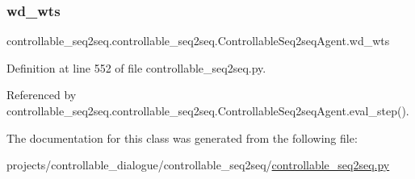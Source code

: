 \subsubsection{\texorpdfstring{wd\+\_\+wts}{wd\_wts}}
{\footnotesize\ttfamily controllable\+\_\+seq2seq.\+controllable\+\_\+seq2seq.\+Controllable\+Seq2seq\+Agent.\+wd\+\_\+wts}



Definition at line 552 of file controllable\+\_\+seq2seq.\+py.



Referenced by controllable\+\_\+seq2seq.\+controllable\+\_\+seq2seq.\+Controllable\+Seq2seq\+Agent.\+eval\+\_\+step().



The documentation for this class was generated from the following file\+:\begin{DoxyCompactItemize}
\item 
projects/controllable\+\_\+dialogue/controllable\+\_\+seq2seq/\hyperlink{controllable__seq2seq_8py}{controllable\+\_\+seq2seq.\+py}\end{DoxyCompactItemize}
